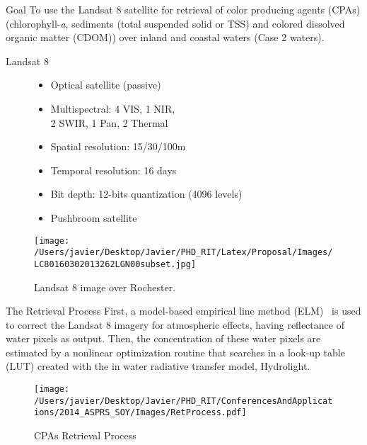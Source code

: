 \documentclass[mathserif]{beamer}
\begin{document}
\begin{frame}{}
\begin{columns}[t]
\begin{column}{.3\linewidth}
\begin{block}{Goal}
\justifying\small 
To use the Landsat 8 satellite for retrieval of color producing agents (CPAs) (chlorophyll-{\it a}, sediments (total suspended solid or TSS) and colored dissolved organic matter (CDOM)) over inland and coastal waters (Case 2 waters). 
\end{block}
\begin{block}{Landsat 8}
\begin{figure}[htb]
\begin{minipage}[c]{0.48\linewidth}
\small
\begin{itemize}
	\item Optical satellite (passive)
	\vspace{.2cm}
	\item Multispectral: 4 VIS, 1 NIR, \\2 SWIR, 1 Pan, 2 Thermal
	\vspace{.2cm}
	\item Spatial resolution: 15/30/100m
	\vspace{.2cm}
	\item Temporal resolution: 16 days
	\vspace{.2cm}
	\item Bit depth: 12-bits quantization (4096 levels)
	\vspace{.2cm}
	\item Pushbroom satellite
\end{itemize}
\end{minipage}
\hfill
\begin{minipage}[c]{0.48\linewidth}
  	\centering
  	\texttt{[image: /Users/javier/Desktop/Javier/PHD\_RIT/Latex/Proposal/Images/LC80160302013262LGN00subset.jpg]}
  \caption{Landsat 8 image over Rochester. \label{fig:Scene} } 
\end{minipage}
\end{figure}

\vspace{-.5cm}
\end{block}
\begin{block}{The Retrieval Process}
\justifying\small First, a model-based empirical line method (ELM)~\cite{Concha2014SPIE} is used to correct the Landsat 8 imagery for atmospheric effects, having reflectance of water pixels as output. Then, the concentration of these water pixels are estimated by a nonlinear optimization routine that searches in a look-up table (LUT) created with the in water radiative transfer model, Hydrolight.
\vspace{1cm}   
\begin{center}
\begin{figure}[H]
    \texttt{[image: /Users/javier/Desktop/Javier/PHD\_RIT/ConferencesAndApplications/2014\_ASPRS\_SOY/Images/RetProcess.pdf]}
    \caption{CPAs Retrieval Process}
\end{figure}
\end{center}
\end{block}


\end{column}
\end{columns}
\end{frame}
\end{document}
